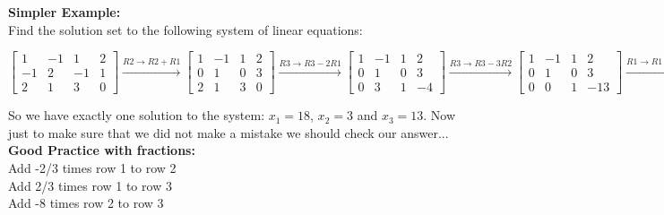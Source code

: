 \documentclass[12pt]{article}
\begin{document}
 

{\bf Simpler Example:}\\

Find the solution set to the following system of linear equations:



$
\left[ \begin {array}{ccc|c} 1&-1&1&2\\ -1&2&-1&1
\\ 2&1&3&0\end {array} \right] 
\xrightarrow[]{R2\rightarrow R2+R1}
\left[ 
\begin {array}{ccc|c} 1&-1&1&2\\ 0&1&0&3
\\ 2&1&3&0\end {array} \right] 
\xrightarrow[]{R3\rightarrow R3-2R1} 


\left[ \begin {array}{ccc|c} 1&-1&1&2\\ 0&1&0&3
\\ 0&3&1&-4\end {array} \right] 
\xrightarrow[]{R3\rightarrow R3-3R2}
 \left[ 
\begin {array}{ccc|c} 1&-1&1&2\\ 0&1&0&3
\\ 0&0&1&-13\end {array} \right] 
\xrightarrow[]{R1\rightarrow R1+R2}
 \left[ \begin {array}{ccc|c} 1&0&1&5\\ 0&1&0&3
\\ 0&0&1&-13\end {array} \right] 

\xrightarrow[]{R1\rightarrow R1-R3}
 \left[ 
\begin {array}{ccc|c} 1&0&0&18\\ 0&1&0&3
\\ 0&0&1&-13\end {array} \right] 
$

So we have exactly one solution to the system: $x_1 = 18$, $x_2 = 3$ and $x_3=13$.  Now just to make sure that we did not make a mistake we should check our answer...\\





{\bf Good Practice with fractions:}\\


Add -2/3 times row 1 to row 2\\
Add 2/3 times row 1 to row 3\\
 Add -8 times row 2 to row 3\\
\end{document}
